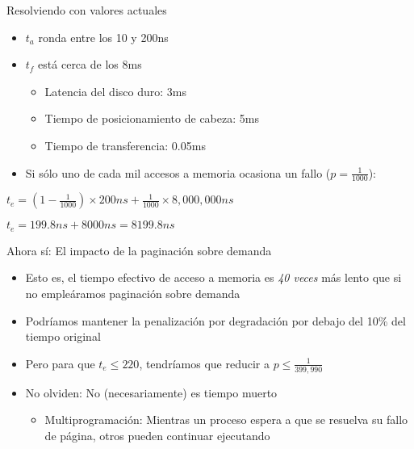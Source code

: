 \documentclass[presentation]{beamer}
\begin{document}
\begin{frame}[label={sec:org209f3d9}]{Resolviendo con valores actuales}
\begin{itemize}
\item \(t_a\) ronda entre los 10 y 200ns
\item \(t_f\) está cerca de los 8ms
\begin{itemize}
\item Latencia del disco duro: 3ms
\item Tiempo de posicionamiento de cabeza: 5ms
\item Tiempo de transferencia: 0.05ms
\end{itemize}
\item Si sólo uno de cada mil accesos a memoria ocasiona un fallo
(\(p=\frac{1}{1000}\)):
\end{itemize}
\begin{center}
\(t_e = (1-\frac{1}{1000}) \times 200ns + \frac{1}{1000} \times 8,000,000ns\)

\(t_e = 199.8ns + 8000ns = 8199.8ns\)
\end{center}
\end{frame}

\begin{frame}[label={sec:org67ce158}]{Ahora sí: El impacto de la paginación sobre demanda}
\begin{itemize}
\item Esto es, el tiempo efectivo de acceso a memoria es \emph{40 veces} más
lento que si no empleáramos paginación sobre demanda
\item Podríamos mantener la penalización por degradación por debajo del
10\% del tiempo original
\item Pero para que \(t_e \le 220\), tendríamos que reducir a \(p \le
  \frac{1}{399,990}\)
\end{itemize}
\pause
\begin{itemize}
\item No olviden: No (necesariamente) es tiempo muerto
\begin{itemize}
\item Multiprogramación: Mientras un proceso espera a que se resuelva su
fallo de página, otros pueden continuar ejecutando
\end{itemize}
\end{itemize}
\end{frame}
\end{document}
